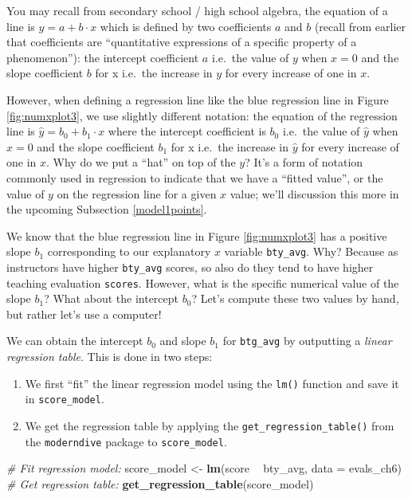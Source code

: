 \documentclass[12pt, krantz2,]{krantz}
\makeatletter
\newenvironment{Shaded}{\begin{snugshade}}{\end{snugshade}}
\newcommand{\CommentTok}[1]{\textcolor[rgb]{0.37,0.37,0.37}{\textit{#1}}}
\newcommand{\DataTypeTok}[1]{\textcolor[rgb]{0.27,0.27,0.27}{#1}}
\newcommand{\KeywordTok}[1]{\textcolor[rgb]{0.27,0.27,0.27}{\textbf{#1}}}
\newcommand{\NormalTok}[1]{#1}
\newcommand{\OperatorTok}[1]{\textcolor[rgb]{0.43,0.43,0.43}{\textbf{#1}}}
\newcommand{\StringTok}[1]{\textcolor[rgb]{0.5,0.5,0.5}{#1}}
\providecommand{\tightlist}{%
  \setlength{\itemsep}{0pt}\setlength{\parskip}{0pt}}
\newenvironment{kframe}{%
\medskip{}
\setlength{\fboxsep}{.8em}
 \def\at@end@of@kframe{}%
 \ifinner\ifhmode%
  \def\at@end@of@kframe{\end{minipage}}%
  \begin{minipage}{\columnwidth}%
 \fi\fi%
 \def\FrameCommand##1{\hskip\@totalleftmargin \hskip-\fboxsep
 \colorbox{shadecolor}{##1}\hskip-\fboxsep
     \hskip-\linewidth \hskip-\@totalleftmargin \hskip\columnwidth}%
 \MakeFramed {\advance\hsize-\width
   \@totalleftmargin\z@ \linewidth\hsize
   \@setminipage}}%
 {\par\unskip\endMakeFramed%
 \at@end@of@kframe}
\renewenvironment{Shaded}{\begin{kframe}}{\end{kframe}}
\makeatother
\begin{document}
You may recall from secondary school / high school algebra, the equation of a line is \(y = a + b\cdot x\) which is defined by two coefficients \(a\) and \(b\) (recall from earlier that coefficients are ``quantitative expressions of a specific property of a phenomenon''): the intercept coefficient \(a\) i.e.~the value of \(y\) when \(x = 0\) and the slope coefficient \(b\) for x i.e.~the increase in \(y\) for every increase of one in \(x\).

However, when defining a regression line like the blue regression line in Figure \ref{fig:numxplot3}, we use slightly different notation: the equation of the regression line is \(\widehat{y} = b_0 + b_1 \cdot x\) where the intercept coefficient is \(b_0\) i.e.~the value of \(\widehat{y}\) when \(x=0\) and the slope coefficient \(b_1\) for x i.e.~the increase in \(\widehat{y}\) for every increase of one in \(x\). Why do we put a ``hat'' on top of the \(y\)? It's a form of notation commonly used in regression to indicate that we have a ``fitted value'', or the value of \(y\) on the regression line for a given \(x\) value; we'll discussion this more in the upcoming Subsection \ref{model1points}.

We know that the blue regression line in Figure \ref{fig:numxplot3} has a positive slope \(b_1\) corresponding to our explanatory \(x\) variable \texttt{bty\_avg}. Why? Because as instructors have higher \texttt{bty\_avg} scores, so also do they tend to have higher teaching evaluation \texttt{scores}. However, what is the specific numerical value of the slope \(b_1\)? What about the intercept \(b_0\)? Let's compute these two values by hand, but rather let's use a computer!

We can obtain the intercept \(b_0\) and slope \(b_1\) for \texttt{btg\_avg} by outputting a \emph{linear regression table}. This is done in two steps:

\begin{enumerate}
\def\labelenumi{\arabic{enumi}.}
\tightlist
\item
  We first ``fit'' the linear regression model using the \texttt{lm()} function and save it in \texttt{score\_model}.
\item
  We get the regression table by applying the \texttt{get\_regression\_table()} from the \texttt{moderndive} package to \texttt{score\_model}.
\end{enumerate}

\begin{Shaded}
\begin{Highlighting}[]
\CommentTok{# Fit regression model:}
\NormalTok{score_model <-}\StringTok{ }\KeywordTok{lm}\NormalTok{(score }\OperatorTok{~}\StringTok{ }\NormalTok{bty_avg, }\DataTypeTok{data =}\NormalTok{ evals_ch6)}
\CommentTok{# Get regression table:}
\KeywordTok{get_regression_table}\NormalTok{(score_model)}
\end{Highlighting}
\end{Shaded}
\end{document}
